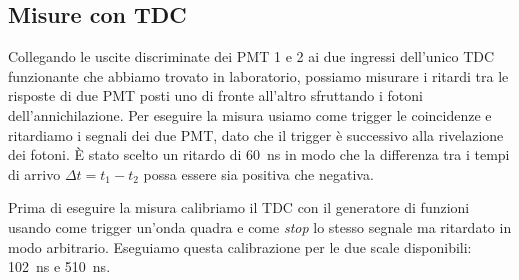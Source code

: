\subsection{Misure con TDC}

Collegando le uscite discriminate dei PMT 1 e 2 ai due ingressi dell'unico TDC funzionante che abbiamo trovato in laboratorio, possiamo misurare i ritardi tra le risposte di due PMT posti uno di fronte all'altro sfruttando i fotoni dell'annichilazione. Per eseguire la misura usiamo come trigger le coincidenze e ritardiamo i segnali dei due PMT, dato che il trigger è successivo alla rivelazione dei fotoni. \`E stato scelto un ritardo di \SI{60}{ns} in modo che la differenza tra i tempi di arrivo $\Delta t=t_1-t_2$ possa essere sia positiva che negativa.

Prima di eseguire la misura calibriamo il TDC con il generatore di funzioni usando come trigger un'onda quadra e come \emph{stop} lo stesso segnale ma ritardato in modo arbitrario.
Eseguiamo questa calibrazione per le due scale disponibili: \SI{102}{ns} e \SI{510}{ns}.